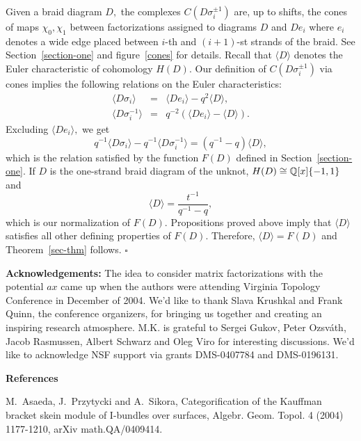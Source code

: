 \documentclass[12pt]{article}
\begin{document}
Given a braid diagram $D,$ the complexes $C(D\sigma^{\pm 1}_i)$ are, 
up to shifts, the cones of maps $\chi_0, \chi_1$ between factorizations 
assigned to diagrams $D$ and $De_i$ where $e_i$ denotes a wide edge 
placed between $i$-th and $(i+1)$-st strands of the braid. See 
Section~\ref{section-one} and figure~\ref{cones} for details. Recall that 
$\langle D\rangle$ denotes the Euler characteristic of cohomology $H(D).$ 
Our definition of $C(D\sigma^{\pm 1}_i)$ via cones implies the following 
relations on the Euler characteristics: 
\begin{eqnarray*} 
 \langle D\sigma_i \rangle & = & \langle De_i \rangle - q^2 \langle  D \rangle , \\
 \langle D\sigma^{-1}_i \rangle & = & q^{-2}( \langle De_i \rangle - 
   \langle  D \rangle).
 \end{eqnarray*} 
Excluding $\langle De_i \rangle,$ we get 
\begin{equation*} 
  q^{-1} \langle D\sigma_i \rangle - q^{-1}  \langle D\sigma^{-1}_i \rangle 
    = ( q^{-1} - q)  \langle  D \rangle ,
\end{equation*} 
which is the relation satisfied by the function $F(D)$ defined in Section~\ref{section-one}. 
If $D$ is the one-strand braid diagram of the unknot, $H(D) \cong \mathbb Q[x]\{-1,1\}$ 
and 
$$\langle D \rangle = \frac{t^{-1}}{q^{-1}-q},$$ 
which is our normalization of $F(D).$ Propositions proved above imply that 
$\langle D \rangle$ satisfies all other defining properties of $F(D).$ Therefore, 
$\langle D \rangle = F(D)$ and Theorem~\ref{sec-thm} follows. $\square$ 




\vspace{0.2in} 

{\bf Acknowledgements:} The idea to consider matrix factorizations with 
the potential $ax$ came up when the authors were attending Virginia 
Topology Conference in December of 2004. We'd like to thank 
Slava Krushkal and Frank Quinn, the conference organizers, 
for bringing 
us together and creating an inspiring research atmosphere. 
M.K. is grateful to Sergei Gukov, 
Peter Ozsv\'ath, Jacob Rasmussen, Albert Schwarz and Oleg Viro for 
interesting discussions. We'd like to acknowledge 
NSF support via grants DMS-0407784 
and DMS-0196131.  
      
     


\vspace{0.2in} 

{\bf References} 

\noindent
[APS] M.~Asaeda, J.~Przytycki and A.~Sikora, Categorification of the 
Kauffman bracket skein module of I-bundles over surfaces, Algebr. Geom. Topol. 
4 (2004) 1177-1210, arXiv  math.QA/0409414. 
\end{document}

